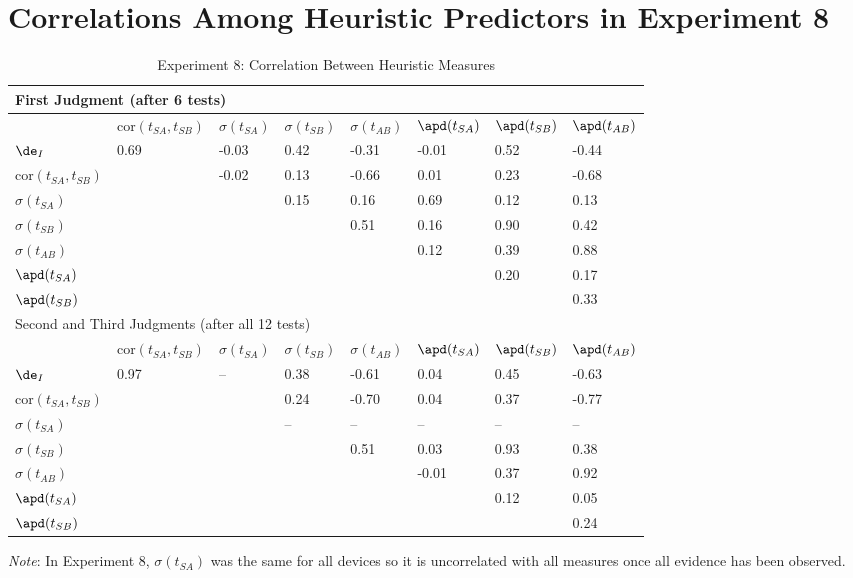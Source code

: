 \clearpage

\section{Correlations Among Heuristic Predictors in Experiment 8}

\begin{table}[h!]
\caption{Experiment 8: Correlation Between Heuristic Measures}
\centering
\footnotesize{
\begin{tabularx}{\columnwidth}{lXXXXXXX}
\toprule
\multicolumn{8}{l}{First Judgment (after 6 tests)}\\
\midrule
& cor$(t_{SA},t_{SB})$ & $\sigma(t_{SA})$ & $\sigma(t_{SB})$ & $\sigma(t_{AB})$ & $\apd(t_{SA})$ & $\apd(t_{SB})$ & $\apd(t_{AB})$ \\ 
\midrule
$\de_I$  &   0.69 & -0.03 & 0.42 & -0.31 & -0.01 & 0.52 & -0.44 \\ 
cor$(t_{SA},t_{SB})$ &    & -0.02 & 0.13 & -0.66 & 0.01 & 0.23 & -0.68 \\ 
$\sigma(t_{SA})$ &    &  & 0.15 & 0.16 & 0.69 & 0.12 & 0.13 \\ 
$\sigma(t_{SB})$ &    &  &  & 0.51 & 0.16 & 0.90 & 0.42 \\ 
$\sigma(t_{AB})$ &    &  &  &  & 0.12 & 0.39 & 0.88 \\ 
$\apd(t_{SA})$ &    &  &  &  &  & 0.20 & 0.17 \\ 
$\apd(t_{SB})$ &    &  &  &  &  &  & 0.33 \\ 
\midrule
\multicolumn{8}{l}{Second and Third Judgments (after all 12 tests)}\\
\midrule
&  cor$(t_{SA},t_{SB})$ & $\sigma(t_{SA})$ & $\sigma(t_{SB})$ & $\sigma(t_{AB})$ & $\apd(t_{SA})$ & $\apd(t_{SB})$ & $\apd(t_{AB})$ \\ 
\midrule
$\de_I$   & 0.97 & -- & 0.38 & -0.61 & 0.04 & 0.45 & -0.63 \\ 
cor$(t_{SA},t_{SB})$  &  &  & 0.24 & -0.70 & 0.04 & 0.37 & -0.77 \\ 
$\sigma(t_{SA})$  &  &  & -- & -- & -- & -- & -- \\ 
$\sigma(t_{SB})$   &  &  &  & 0.51 & 0.03 & 0.93 & 0.38 \\ 
$\sigma(t_{AB})$   &  &  &  &  & -0.01 & 0.37 & 0.92 \\ 
$\apd(t_{SA})$   &  &  &  &  &  & 0.12 & 0.05 \\ 
$\apd(t_{SB})$   &  &  &  &  &  &  & 0.24 \\ 
\bottomrule
\end{tabularx}
}
\vspace{.3cm}
\raggedright

\scriptsize{\emph{Note}: In Experiment 8, $\sigma(t_{SA})$ was the same for all devices so it is uncorrelated with all measures once all evidence has been observed.}
\end{table}


